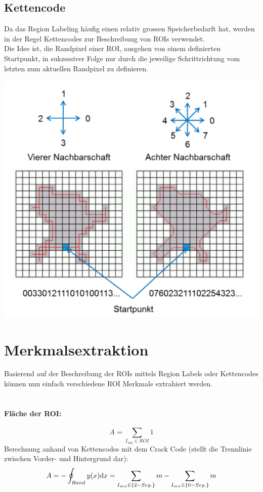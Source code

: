 \subsection{Kettencode}
Da das Region Labeling häufig einen relativ grossen Speicherbedarft hat, werden in der Regel Kettencodes zur Beschreibung von ROIs verwendet.\\
Die Idee ist, die Randpixel einer ROI, 
ausgehen von einem definierten Startpunkt, 
in sukzessiver Folge nur durch die jeweilige Schrittrichtung vom letzten zum aktuellen Randpixel zu definieren.
\begin{center}
	\includegraphics[scale=.5]{./images/kettencode.png}
\end{center}

\section{Merkmalsextraktion}
Basierend auf der Beschreibung der ROIs mittels Region Labels oder Kettencodes können nun einfach verschiedene ROI Merkmale extrahiert werden.\\
\\
\paragraph{Fläche der ROI:}
\[
	A = \sum_{I_{mn} \in ROI}1
\]
Berechnung anhand von Kettencodes mit dem Crack Code (stellt die Trennlinie zwischen Vorder- und Hintergrund dar):
\[
	A = -\oint_{Rand}y(x)\mathrm{d} x = \sum_{I_{mn} \in \{2-Seg.\}}m - \sum_{I_{mn} \in \{0-Seg.\}}m 
\]
~\\\\
